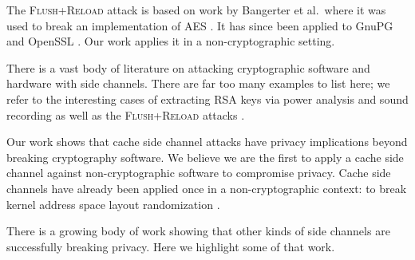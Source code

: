 \documentclass[letterpaper,twocolumn,10pt]{article}
\begin{document}
The \textsc{Flush+Reload} attack is based on work by Bangerter et al.\ where it was used
to break an implementation of AES \cite{gullasch2011cache}. It has since been
applied to GnuPG \cite{yarom2013flush} and OpenSSL \cite{benger2014ooh,
yarom2014recovering}. Our work applies it in a non-cryptographic setting.

There is a vast body of literature on attacking cryptographic software and
hardware with side channels. There are far too many examples to list here; we
refer to the interesting cases of extracting RSA keys via power analysis
\cite{messerges1999power} and sound recording \cite{genkin2013rsa} as well as
the \textsc{Flush+Reload} attacks \cite{yarom2013flush, benger2014ooh,
yarom2014recovering}.

Our work shows that cache side channel attacks have privacy implications beyond
breaking cryptography software. We believe we are the first to apply a cache
side channel against non-cryptographic software to compromise privacy. Cache
side channels have already been applied once in a non-cryptographic context: to
break kernel address space layout randomization \cite{hund2013practical}.

There is a growing body of work showing that other kinds of side channels are
successfully breaking privacy. Here we highlight some of that work.
\end{document}
